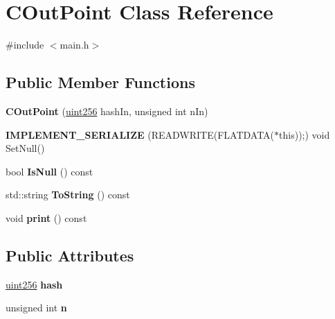 \hypertarget{class_c_out_point}{}\section{C\+Out\+Point Class Reference}
\label{class_c_out_point}


{\ttfamily \#include $<$main.\+h$>$}

\subsection*{Public Member Functions}
\begin{DoxyCompactItemize}
\item 
\mbox{\label{class_c_out_point_a59286d6685530ba330943198e6f81812}} 
{\bfseries C\+Out\+Point} (\mbox{\hyperlink{classuint256}{uint256}} hash\+In, unsigned int n\+In)
\item 
\mbox{\label{class_c_out_point_ad9d84cab97ae19184dbf9a6421b1c263}} 
{\bfseries I\+M\+P\+L\+E\+M\+E\+N\+T\+\_\+\+S\+E\+R\+I\+A\+L\+I\+ZE} (R\+E\+A\+D\+W\+R\+I\+TE(F\+L\+A\+T\+D\+A\+TA($\ast$this));) void Set\+Null()
\item 
\mbox{\label{class_c_out_point_ae1516581fa2234556761f04af3a207a6}} 
bool {\bfseries Is\+Null} () const
\item 
\mbox{\label{class_c_out_point_ab0026adab6a1098cf00de05c872fbb5d}} 
std\+::string {\bfseries To\+String} () const
\item 
\mbox{\label{class_c_out_point_a09a10df769151c48f77a20bbcef8f452}} 
void {\bfseries print} () const
\end{DoxyCompactItemize}
\subsection*{Public Attributes}
\begin{DoxyCompactItemize}
\item 
\mbox{\label{class_c_out_point_af131c7194a660558b0ff158f4efa7a28}} 
\mbox{\hyperlink{classuint256}{uint256}} {\bfseries hash}
\item 
\mbox{\label{class_c_out_point_a9fbc648ca0d11421ad66e897185a9b58}} 
unsigned int {\bfseries n}
\end{DoxyCompactItemize}
